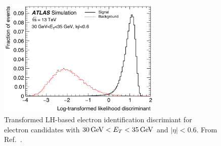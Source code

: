 \begin{figure}[!htb]
    \begin{center}
    \includegraphics[width=0.7\textwidth]{figures/chapter3/egamma/egamma_lh_discriminant}
    \caption{
        Transformed LH-based electron identification discrimiant for electron candidates
        with $30\,\text{Ge\kern -0.1em V} < E_T < 35\,\text{Ge\kern -0.1em V}$ and $\lvert \eta \rvert < 0.6$.
        From Ref.~\cite{Aad:2019tso}.
    }
    \label{fig:egamma_lh_discriminant}
    \end{center}
\end{figure}


\FloatBarrier

